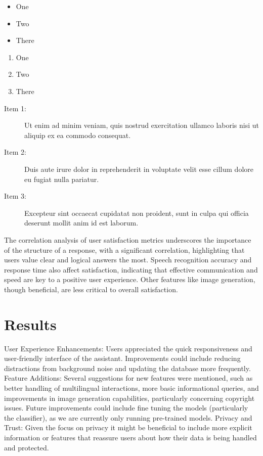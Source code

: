 \documentclass[12pt]{article}
\begin{document}
\begin{itemize}
\item One
\item Two
\item There
\end{itemize}

\begin{enumerate}
\item One
\item Two
\item There
\end{enumerate}

\begin{description}
\item[Item 1:] Ut enim ad minim veniam, quis nostrud exercitation ullamco
laboris nisi ut aliquip ex ea commodo consequat.
\item[Item 2:]  Duis aute irure dolor in reprehenderit in voluptate
velit esse cillum dolore eu fugiat nulla pariatur.
\item[Item 3:]  Excepteur sint occaecat cupidatat non proident, sunt in
culpa qui officia deserunt mollit anim id est laborum.

\end{description}

The correlation analysis of user satisfaction metrics underscores the importance of the structure of a response, with a significant correlation, highlighting that users value clear and logical answers the most. Speech recognition accuracy and response time also affect satisfaction, indicating that effective communication and speed are key to a positive user experience. Other features like image generation, though beneficial, are less critical to overall satisfaction.

\section{Results}

User Experience Enhancements: Users appreciated the quick responsiveness and user-friendly interface of the assistant. Improvements could include reducing distractions from background noise and updating the database more frequently.
Feature Additions: Several suggestions for new features were mentioned, such as better handling of multilingual interactions, more basic informational queries, and improvements in image generation capabilities, particularly concerning copyright issues. Future improvements could include fine tuning the models (particularly the classifier), as we are currently only running pre-trained models. 
Privacy and Trust: Given the focus on privacy it might be beneficial to include more explicit information or features that reassure users about how their data is being handled and protected. 
\end{document}
